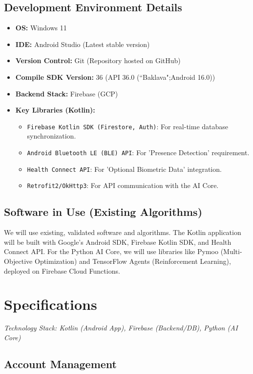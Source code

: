 \documentclass[conference]{IEEEtran}
\begin{document}
\subsection{Development Environment Details}
\begin{itemize}
    \item \textbf{OS:} Windows 11
    \item \textbf{IDE:} Android Studio (Latest stable version)
    \item \textbf{Version Control:} Git (Repository hosted on GitHub)
    \item \textbf{Compile SDK Version:} 36 (API 36.0 (``Baklava";Android 16.0))
    \item \textbf{Backend Stack:} Firebase (GCP)
    \item \textbf{Key Libraries (Kotlin):}
        \begin{itemize}
            \item \texttt{Firebase Kotlin SDK (Firestore, Auth)}: For real-time database synchronization.
            \item \texttt{Android Bluetooth LE (BLE) API}: For 'Presence Detection' requirement.
            \item \texttt{Health Connect API}: For 'Optional Biometric Data' integration.
            \item \texttt{Retrofit2/OkHttp3}: For API communication with the AI Core.
        \end{itemize}
\end{itemize}

\subsection{Software in Use (Existing Algorithms)}
We will use existing, validated software and algorithms. The Kotlin application will be built with Google’s Android SDK, Firebase Kotlin SDK, and Health Connect API. For the Python AI Core, we will use libraries like Pymoo (Multi-Objective Optimization) and TensorFlow Agents (Reinforcement Learning), deployed on Firebase Cloud Functions.


\section{Specifications}
\textit{Technology Stack: Kotlin (Android App), Firebase (Backend/DB), Python (AI Core)}

\subsection{Account Management} 
\end{document}

